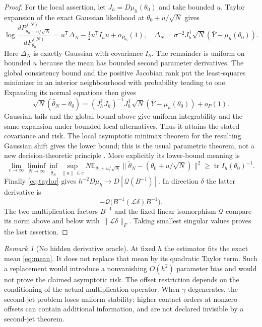 \documentclass[11pt,reqno]{amsart}
\numberwithin{equation}{section}
\theoremstyle{definition}\newtheorem{definition}[theorem]{Definition}
\theoremstyle{remark}\newtheorem{remark}[theorem]{Remark}
\newcommand{\tr}{\operatorname{tr}}
\newcommand{\cL}{\mathcal L}
\begin{document}
\begin{proof}
For the local assertion, let $J_h=D\mu_h(\theta_0)$ and take bounded $u$. Taylor expansion of the exact Gaussian likelihood at $\theta_0+u/\sqrt N$ gives
\[
 \log\frac{dP^{(N)}_{\theta_0+u/\sqrt N}}{dP^{(N)}_{\theta_0}}
 =u^{\mathsf T}\Delta_N-\tfrac12u^{\mathsf T}I_hu+o_{P_{\theta_0}}(1),
 \quad
 \Delta_N=\sigma^{-2}J_h^{\mathsf T}\sqrt N(\bar Y-\mu_h(\theta_0)).
\]
Here $\Delta_N$ is exactly Gaussian with covariance $I_h$. The remainder is uniform on bounded $u$ because the mean has bounded second parameter derivatives. The global consistency bound and the positive Jacobian rank put the least-squares minimizer in an interior neighbourhood with probability tending to one. Expanding its normal equations then gives
\[
 \sqrt N(\widehat\theta_N-\theta_0)
 =(J_h^{\mathsf T}J_h)^{-1}J_h^{\mathsf T}\sqrt N(\bar Y-\mu_h(\theta_0))+o_P(1).
\]
Gaussian tails and the global bound above give uniform integrability and the same expansion under bounded local alternatives. Thus it attains the stated covariance and risk. The local asymptotic minimax theorem for the resulting Gaussian shift gives the lower bound; this is the usual parametric theorem, not a new decision-theoretic principle \cite[Chapters 7--8]{vdV}. More explicitly its lower-bound meaning is
\[
 \lim_{c\to\infty}\liminf_{N\to\infty}\inf_{\widetilde\theta_N}
 \sup_{\|u\|\le c}N\mathbb E_{\theta_0+u/\sqrt N}
 \|\widetilde\theta_N-(\theta_0+u/\sqrt N)\|^2
 \ge\tr I_h(\theta_0)^{-1}.
\]
Finally \eqref{eq:taylor} gives $h^{-2}D\mu_h\to D[\mathcal Q(B^{-1})]$. In direction $\delta$ the latter derivative is
\[
 -\mathcal Q\big(B^{-1}(\cL\delta)B^{-1}\big).
\]
The two multiplication factors $B^{-1}$ and the fixed linear isomorphism $\mathcal Q$ compare its norm above and below with $\|\cL\delta\|_F$. Taking smallest singular values proves the last assertion.
\end{proof}

\begin{remark}[No hidden derivative oracle]
At fixed $h$ the estimator fits the exact mean \eqref{eq:mean}. It does not replace that mean by its quadratic Taylor term. Such a replacement would introduce a nonvanishing $O(h^2)$ parameter bias and would not prove the claimed asymptotic risk. The offset restriction depends on the conditioning of the actual multiplication operator. When $\gamma$ degenerates, the second-jet problem loses uniform stability; higher contact orders at nonzero offsets can contain additional information, and are not declared invisible by a second-jet theorem.
\end{remark}
\end{document}
